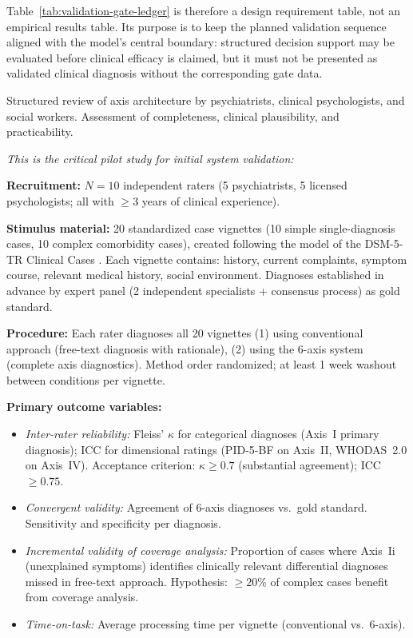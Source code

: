 \documentclass[11pt,a4paper]{article}
\begin{document}
Table~\ref{tab:validation-gate-ledger} is therefore a design requirement table, not an empirical results table. Its purpose is to keep the planned validation sequence aligned with the model's central boundary: structured decision support may be evaluated before clinical efficacy is claimed, but it must not be presented as validated clinical diagnosis without the corresponding gate data.

\begin{description}[style=nextline, leftmargin=1.5cm, font=\bfseries]
\item[Phase~1: Expert Review (N=10--15)] Structured review of axis architecture by psychiatrists, clinical psychologists, and social workers. Assessment of completeness, clinical plausibility, and practicability.

\item[Phase~2: Inter-Rater Reliability Study with Case Vignettes (N=10 raters, 20 vignettes)] \textit{This is the critical pilot study for initial system validation:}

\textbf{Recruitment:} $N = 10$ independent raters (5 psychiatrists, 5 licensed psychologists; all with $\geq 3$ years of clinical experience).

\textbf{Stimulus material:} 20 standardized case vignettes (10 simple single-diagnosis cases, 10 complex comorbidity cases), created following the model of the DSM-5-TR Clinical Cases \citep{BarnhillDSM5ClinicalCases}. Each vignette contains: history, current complaints, symptom course, relevant medical history, social environment. Diagnoses established in advance by expert panel (2 independent specialists + consensus process) as gold standard.

\textbf{Procedure:} Each rater diagnoses all 20 vignettes (1) using conventional approach (free-text diagnosis with rationale), (2) using the 6-axis system (complete axis diagnostics). Method order randomized; at least 1 week washout between conditions per vignette.

\textbf{Primary outcome variables:}
\begin{itemize}[leftmargin=*, noitemsep]
    \item \textit{Inter-rater reliability:} Fleiss' $\kappa$ for categorical diagnoses (Axis~I primary diagnosis); ICC for dimensional ratings (PID-5-BF on Axis~II, WHODAS~2.0 on Axis~IV). Acceptance criterion: $\kappa \geq 0.7$ (substantial agreement); ICC $\geq 0.75$.
    \item \textit{Convergent validity:} Agreement of 6-axis diagnoses vs.\ gold standard. Sensitivity and specificity per diagnosis.
    \item \textit{Incremental validity of coverage analysis:} Proportion of cases where Axis~Ii (unexplained symptoms) identifies clinically relevant differential diagnoses missed in free-text approach. Hypothesis: $\geq 20$\% of complex cases benefit from coverage analysis.
    \item \textit{Time-on-task:} Average processing time per vignette (conventional vs.\ 6-axis).
\end{itemize}


\end{description}
\end{document}

